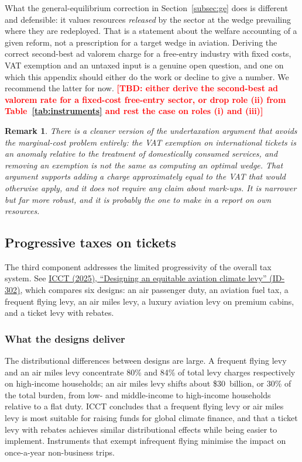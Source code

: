 \documentclass[11pt]{article}
\newtheorem{remark}{Remark}
\newcommand{\tbd}[1]{\textcolor{red}{\textbf{[TBD: #1]}}}
\begin{document}
What the general-equilibrium correction in Section~\ref{subsec:ge} does is
different and defensible: it values resources \emph{released} by the sector at
the wedge prevailing where they are redeployed. That is a statement about the
welfare accounting of a given reform, not a prescription for a target wedge in
aviation. Deriving the correct second-best ad valorem charge for a
free-entry industry with fixed costs, VAT exemption and an untaxed input is a
genuine open question, and one on which this appendix should either do the work
or decline to give a number. We recommend the latter for now.
\tbd{either derive the second-best ad valorem rate for a fixed-cost free-entry
sector, or drop role (ii) from Table~\ref{tab:instruments} and rest the case on
roles (i) and (iii)}

\begin{remark}
There is a cleaner version of the undertaxation argument that avoids the
marginal-cost problem entirely: the VAT exemption on international tickets is an
anomaly relative to the treatment of domestically consumed services, and
removing an exemption is not the same as computing an optimal wedge. That
argument supports adding a charge approximately equal to the VAT that would
otherwise apply, and it does not require any claim about mark-ups. It is
narrower but far more robust, and it is probably the one to make in a report on
own resources.
\end{remark}

\subsection{Progressive taxes on tickets}
\label{subsec:progressive}

The third component addresses the limited progressivity of the overall tax
system. See
\href{https://theicct.org/wp-content/uploads/2025/03/ID-302-\%E2\%80\%93-Aviation-levy_report_final-v2.pdf}{ICCT
(2025), ``Designing an equitable aviation climate levy'' (ID-302)}, which
compares six designs: an air passenger duty, an aviation fuel tax, a frequent
flying levy, an air miles levy, a luxury aviation levy on premium cabins, and a
ticket levy with rebates.

\subsubsection{What the designs deliver}

The distributional differences between designs are large. A frequent flying levy
and an air miles levy concentrate 80\% and 84\% of total levy charges
respectively on high-income households; an air miles levy shifts about
\$30~billion, or 30\% of the total burden, from low- and middle-income to
high-income households relative to a flat duty. ICCT concludes that a frequent
flying levy or air miles levy is most suitable for raising funds for global
climate finance, and that a ticket levy with rebates achieves similar
distributional effects while being easier to implement. Instruments that exempt
infrequent flying minimise the impact on once-a-year non-business trips.
\end{document}
